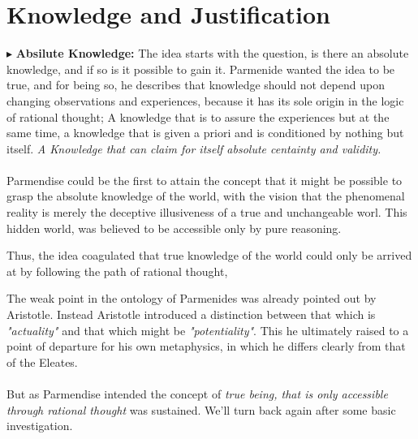 \documentclass[9pt,a4paper,twocolumn]{article}
\newcommand{\newpoint}[1]{\indent$\blacktriangleright$ \textbf{#1}}
\begin{document}
        \section{Knowledge and Justification}
            \newpoint{Absilute Knowledge:} The idea starts with the question, is there an absolute knowledge, and if so is it possible to gain it. Parmenide wanted the idea to be true, and for being so, he describes that knowledge should not depend upon changing observations and experiences, because it has its sole origin in the logic of rational thought; A knowledge that is to assure the experiences but at the same time, a knowledge that is given a priori and is conditioned by nothing but itself. \textit{A Knowledge that can claim for itself absolute centainty and validity.}
            \\
            \\
            Parmendise could be the first to attain the concept that it might be possible to grasp the absolute knowledge of the world, with the vision that the phenomenal reality is merely the deceptive illusiveness of a true and unchangeable worl. This hidden world, was believed to be accessible only by pure reasoning.
            \begin{qt}
                Thus, the idea coagulated that true knowledge of the world could only be arrived at by following the path of rational thought,
            \end{qt}
            The weak point in the ontology of Parmenides was already pointed out by Aristotle. Instead Aristotle introduced a distinction between that which is \textit{"actuality"} and that which might be \textit{"potentiality"}. This he ultimately raised to a point of departure for his own metaphysics, in which he differs clearly from that of the Eleates.
            \\
            \\
            But as Parmendise intended the concept of \textit{true being, that is only accessible through rational thought} was sustained. We'll turn back again after some basic investigation.\cite{Kuppers2018-vv}
\end{document}
